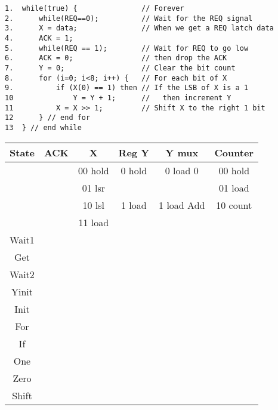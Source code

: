 \begin{description}
\begin{verbatim}
1.  while(true) {               // Forever
2.      while(REQ==0);          // Wait for the REQ signal
3.      X = data;               // When we get a REQ latch data
4.      ACK = 1;		
5.      while(REQ == 1);        // Wait for REQ to go low
6.      ACK = 0;                // then drop the ACK
7.      Y = 0;                  // Clear the bit count
8.      for (i=0; i<8; i++) {   // For each bit of X
9.          if (X(0) == 1) then // If the LSB of X is a 1  
10              Y = Y + 1;      //   then increment Y
11          X = X >> 1;         // Shift X to the right 1 bit
12      } // end for
13  } // end while
\end{verbatim}


\begin{tabular}{c||c|c|c|c|c}  
State   & ACK       &   X         &  Reg Y    & Y mux         & Counter       \\ \hline
        &           &   00 hold   &  0 hold   & 0 load 0      & 00 hold       \\ \hline
        &           &   01 lsr    &           &               & 01 load       \\ \hline
        &           &   10 lsl    &  1 load   & 1 load Add    & 10 count      \\ \hline
        &           &   11 load   &           &               &               \\ \hline \hline
Wait1   &          &           &          &              &             \\ \hline
Get     &          &           &          &              &             \\ \hline
Wait2   &          &           &          &              &             \\ \hline
Yinit   &          &           &          &              &             \\ \hline
Init    &          &           &          &              &             \\ \hline
For     &          &           &          &              &             \\ \hline
If      &          &           &          &              &             \\ \hline
One     &          &           &          &              &             \\ \hline
Zero    &          &           &          &              &             \\ \hline
Shift   &          &           &          &              &             \\ 
\end{tabular}


\end{description}
